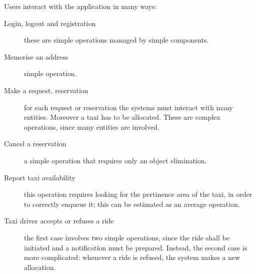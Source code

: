 Users interact with the application in many ways:
\begin{description}

	\item [Login, logout and registration] these are simple operations managed by simple components.
	
	\item [Memorise an address] simple operation.
	
	\item [Make a request, reservation] for each request or reservation the systems must interact with many entities. Moreover a taxi has to be allocated. These are complex operations, since many entities are involved.
	
	\item [Cancel a reservation] a simple operation that requires only an object elimination. 
	
	\item [Report taxi availability] this operation requires looking for the pertinence area of the taxi, in order to correctly enqueue it; this can be estimated as an average operation.
	
	\item [Taxi driver accepts or refuses a ride] the first case involves two simple operations, since the ride shall be initiated and a notification must be prepared. Instead, the second case is more complicated: whenever a ride is refused, the system makes a new allocation.

\end{description}

\newcommand{\myWFP}{2.5cm}


